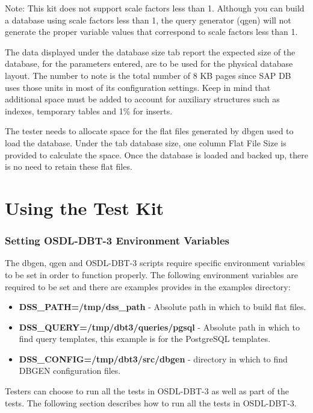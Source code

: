 \documentclass{article}
\begin{document}
Note:  This kit does not support scale factors less than 1.  Although you can
build a database using scale factors less than 1, the query generator (qgen)
will not generate the proper variable values that correspond to scale factors
less than 1.

The data displayed under the database size tab report the expected size of the
database, for the parameters entered, are to be used for the physical database
layout.  The number to note is the total number of 8 KB pages since SAP DB uses
those units in most of its configuration settings.  Keep in mind that
additional space must be added to account for auxiliary structures such as
indexes, temporary tables and 1\% for inserts.

The tester needs to allocate space for the flat files generated by dbgen used
to load the database.  Under the tab database size, one column Flat File Size
is provided to calculate the space.  Once the database is loaded and backed up,
there is no need to retain these flat files.

\section{Using the Test Kit}

\subsubsection{Setting OSDL-DBT-3 Environment Variables}

The dbgen, qgen and OSDL-DBT-3 scripts require specific environment variables
to be set in order to function properly.  The following environment variables
are required to be set and there are examples provides in the examples
directory:

\begin{itemize}
  \item \textbf{DSS\_PATH=/tmp/dss\_path} - Absolute path in which to build
        flat files.
  \item \textbf{DSS\_QUERY=/tmp/dbt3/queries/pgsql} - Absolute path in which to
        find query templates, this example is for the PostgreSQL templates.
  \item \textbf{DSS\_CONFIG=/tmp/dbt3/src/dbgen} - directory in which to find
        DBGEN configuration files.
\end{itemize}

Testers can choose to run all the tests in OSDL-DBT-3 as well as part of the
tests.  The following section describes how to run all the tests in OSDL-DBT-3.
\end{document}
